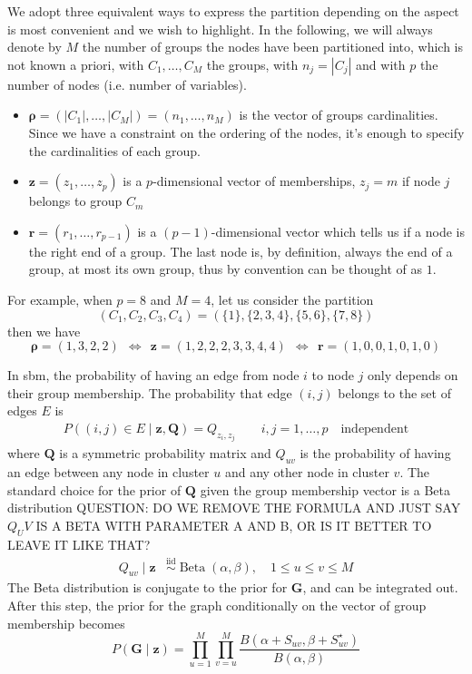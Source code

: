 We adopt three equivalent ways to express the partition depending on the aspect is most convenient and we wish to highlight. In the following, we will always denote by $M$ the number of groups the nodes have been partitioned into, which is not known a priori, with $C_{1}, \dotsc, C_{M}$ the groups, with $n_{j} = |C_{j}|$ and with $p$ the number of nodes (i.e. number of variables).
\begin{itemize}
\item $\bm{\rho} =( |C_{1}| ,\dotsc ,|C_{M}|) =( n_{1} ,\dotsc ,n_{M})$ is the vector of groups cardinalities. Since we have a constraint on the ordering of the nodes, it's enough to specify the cardinalities of each group.
\item $\bm{z} =( z_{1} ,\dotsc ,z_{p})$ is a $p$-dimensional vector of memberships, $z_{j} =m$ if node $j$ belongs to group $C_{m}$
\item $\bm{r} =( r_{1} ,\dotsc ,r_{p-1})$ is a $( p-1)$-dimensional vector which tells us if a node is the right end of a group. The last node is, by definition, always the end of a group, at most its own group, thus by convention can be thought of as $1$.
\end{itemize}
For example, when $p=8$ and $M=4$, let us consider the partition
\[
    (C_{1}, C_{2}, C_{3}, C_{4}) = (\{1\},\{2,3,4\},\{5,6\},\{7,8\})
\]
then we have
\begin{equation*}
\bm{\rho} =( 1,3,2,2) \ \ \iff \ \ \bm{z} =( 1,2,2,2,3,3,4,4) \ \ \iff \ \ \bm{r} =( 1,0,0,1,0,1,0)
\end{equation*}


In \gls{sbm}, the probability of having an edge from node $i$ to node $j$ only depends on their group membership. The probability that edge $(i,j)$ belongs to the set of edges $E$ is
\begin{align*}
P((i,j)\in E\mid\bm{z},\bm{Q})=Q_{z_i,z_j} \qquad i,j=1,\ldots,p \quad \text{independent}
\end{align*}
where $\bm{Q}$ is a symmetric probability matrix and $Q_{uv}$ is the probability of having an edge between any node in cluster $u$ and any other node in cluster $v$. The standard choice for the prior of $\bm{Q}$ given the group membership vector is a Beta distribution QUESTION: DO WE REMOVE THE FORMULA AND JUST SAY $Q_UV$ IS A BETA WITH PARAMETER A AND B, OR IS IT BETTER TO LEAVE IT LIKE THAT?
\begin{align*}
    Q_{uv} \mid \bm{z} & \overset{\mathrm{iid}}{\sim} \operatorname{Beta}(\alpha,\beta),\quad 1\leq u \leq v \leq M
\end{align*}
The Beta distribution is conjugate to the prior for $\bm{G}$, and can be integrated out. After this step, the prior for the graph conditionally on the vector of group membership becomes
\begin{equation}
    P(\bm{G}\mid \bm{z})
    =
    \prod_{u=1}^{M}\prod_{v=u}^{M}
    \frac{B(\alpha + S_{uv}, \beta+ S^{\star}_{uv})}{B(\alpha,\beta)}
    \label{eq:graphlikelihood}
\end{equation}

